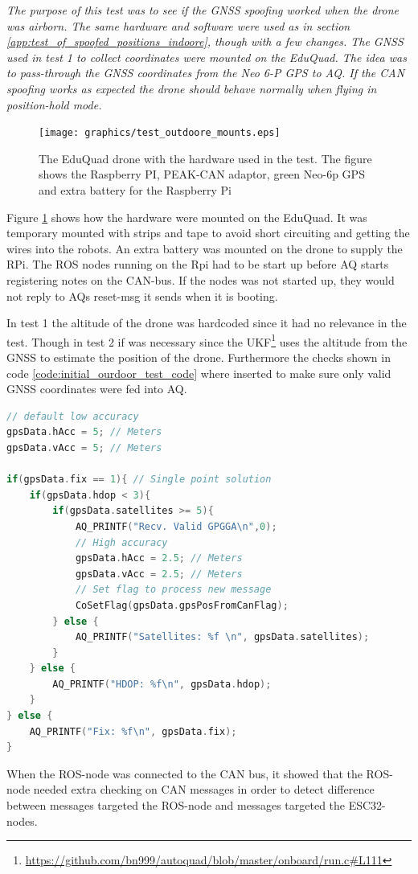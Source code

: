 \textit{The purpose of this test was to see if the GNSS spoofing worked when the drone was airborn. The same hardware and software were used as in section \ref{app:test_of_spoofed_positions_indoore}, though with a few changes.
The GNSS used in test 1 to collect coordinates were mounted on the EduQuad.
The idea was to pass-through the GNSS coordinates from the Neo 6-P GPS to AQ. If the CAN spoofing works as expected the drone should behave normally when flying in position-hold mode.}
\begin{figure}[H]
    \center
    \texttt{[image: graphics/test\_outdoore\_mounts.eps]}
  \caption{The EduQuad drone with the hardware used in the test. The figure shows the Raspberry PI, PEAK-CAN adaptor, green Neo-6p GPS and extra battery for the Raspberry Pi}
    \label{fig:eduquad_bottom_up}
\end{figure}

Figure \ref{fig:eduquad_bottom_up} shows how the hardware were mounted on the EduQuad. It was temporary mounted with strips and tape to avoid short circuiting and getting the wires into the robots.
An extra battery was mounted on the drone to supply the RPi. The ROS nodes running on the Rpi had to be start up before AQ starts registering notes on the CAN-bus. If the nodes was not started up, they would not reply to AQs reset-msg it sends when it is booting. 

In test 1 the altitude of the drone was hardcoded since it had no relevance in the test. Though in test 2 if was necessary since the UKF\footnote{\url{https://github.com/bn999/autoquad/blob/master/onboard/run.c\#L111}} uses the altitude from the GNSS to estimate the position of the drone. Furthermore the checks shown in code \ref{code:initial_ourdoor_test_code} where inserted to make sure only valid GNSS coordinates were fed into AQ.
\begin{center}
\begin{minipage}{\textwidth}
		\begin{lstlisting}[language = c++, caption = Quality checks added to discard bad positions, label=code:initial_ourdoor_test_code]
// default low accuracy
gpsData.hAcc = 5; // Meters
gpsData.vAcc = 5; // Meters

if(gpsData.fix == 1){ // Single point solution
	if(gpsData.hdop < 3){
		if(gpsData.satellites >= 5){
			AQ_PRINTF("Recv. Valid GPGGA\n",0);
			// High accuracy
			gpsData.hAcc = 2.5; // Meters
			gpsData.vAcc = 2.5; // Meters
			// Set flag to process new message
			CoSetFlag(gpsData.gpsPosFromCanFlag);
        } else {
			AQ_PRINTF("Satellites: %f \n", gpsData.satellites);       
        }
    } else {
	    AQ_PRINTF("HDOP: %f\n", gpsData.hdop);    	
    }
} else {
	AQ_PRINTF("Fix: %f\n", gpsData.fix);
}
		\end{lstlisting}
\end{minipage}
\end{center}
When the ROS-node was connected to the CAN bus, it showed that the ROS-node needed extra checking on CAN messages in order to detect difference between messages targeted the ROS-node and messages targeted the ESC32-nodes.


